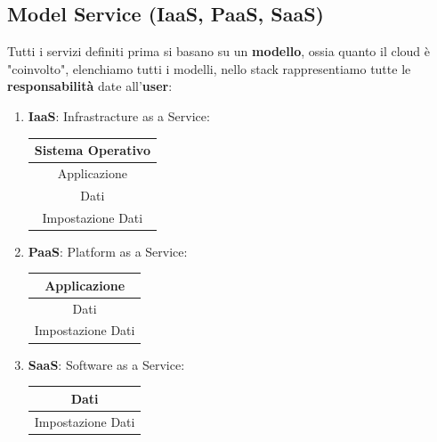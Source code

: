 \documentclass{article}
\begin{document}
\newpage

\subsection{Model Service (IaaS, PaaS, SaaS)}

Tutti i servizi definiti prima si basano su un \textbf{modello}, ossia quanto il cloud è "coinvolto", elenchiamo tutti i modelli, nello stack rappresentiamo tutte le \textbf{responsabilità} date all'\textbf{user}:
\vspace*{5px}
\begin{enumerate}
    \item \textbf{IaaS}: Infrastracture as a Service:
    \vspace*{10px}
    \begin{center}
        \begin{tabular}{ |c| } %
         \hline
         Sistema Operativo \\
         \hline
         Applicazione \\ 
         \hline
         Dati \\
         \hline
         Impostazione Dati \\
         \hline
        \end{tabular}
    \end{center}
    \vspace*{10px}
    \item \textbf{PaaS}: Platform as a Service:
    \vspace*{10px}
    \begin{center}
        \begin{tabular}{ |c| } %
         \hline
         Applicazione \\ 
         \hline
         Dati \\
         \hline
         Impostazione Dati \\
         \hline
        \end{tabular}
    \end{center}
    \vspace*{10px}
    \item \textbf{SaaS}: Software as a Service:
    \vspace*{10px}
    \begin{center}
        \begin{tabular}{ |c| } %
         \hline
         Dati \\
         \hline
         Impostazione Dati \\
         \hline
        \end{tabular}
    \end{center}
\end{enumerate}
\vspace*{10px}
\end{document}
